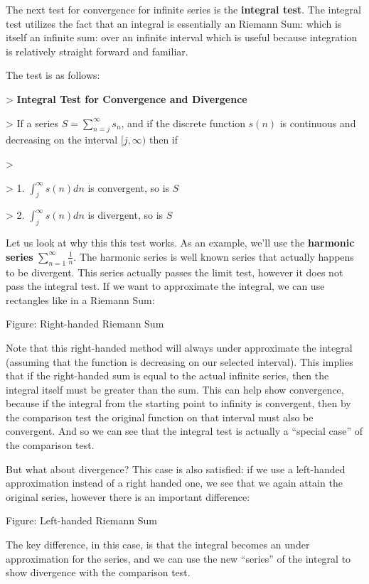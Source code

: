 The next test for convergence for infinite series is the \textbf{integral test}. The integral test utilizes the fact that an integral is essentially an Riemann Sum: which is itself an infinite sum: over an infinite interval which is useful because integration is relatively straight forward and familiar.


The test is as follows:


> \textbf{Integral Test for Convergence and Divergence}

> If a series $S= \sum _{n=j}^{\infty}{s_n}$, and if the discrete function $s(n)$ is continuous and decreasing on the interval $[j, \infty)$ then if

>

> 1.  $\int _{j}^{\infty}{s(n)dn}$ is convergent, so is $S$

> 2.  $\int _{j}^{\infty}{s(n)dn}$ is divergent, so is $S$


Let us look at why this this test works. As an example, we'll use the \textbf{harmonic series} $\sum _{n=1}^{\infty}{\frac{1}{n}}$. The harmonic series is well known series that actually happens to be divergent. This series actually passes the limit test, however it does not pass the integral test. If we want to approximate the integral, we can use rectangles like in a Riemann Sum:




Figure: Right-handed Riemann Sum


Note that this right-handed method will always under approximate the integral (assuming that the function is decreasing on our selected interval). This implies that if the right-handed sum is equal to the actual infinite series, then the integral itself must be greater than the sum. This can help show convergence, because if the integral from the starting point to infinity is convergent, then by the comparison test the original function on that interval must also be convergent. And so we can see that the integral test is actually a ``special case'' of the comparison test.


But what about divergence? This case is also satisfied: if we use a left-handed approximation instead of a right handed one, we see that we again attain the original series, however there is an important difference:




Figure: Left-handed Riemann Sum


The key difference, in this case, is that the integral becomes an under approximation for the series, and we can use the new ``series'' of the integral to show divergence with the comparison test.


